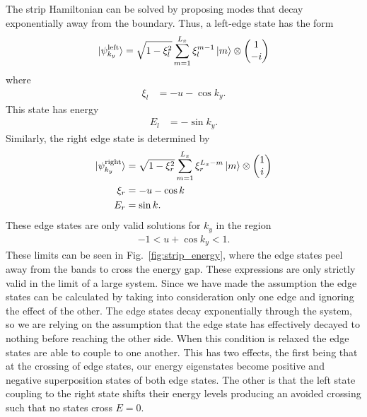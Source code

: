 The strip Hamiltonian can be solved by proposing modes that decay exponentially away from the boundary. Thus, a left-edge state has the form
\begin{align}
    \ket{\psi^{\textup{left}}_{k_y}} = \sqrt{1-\xi_l^2}\sum_{m=1}^{L_x} \xi_l^{m-1}\ket m \otimes \begin{pmatrix}
    1\\
    -i
    \end{pmatrix}
\end{align}
where 
\begin{align}
    \xi_l &= -u - \cos k_y.
\end{align}
This state has energy
\begin{align}
    E_l &= -\sin k_y.
\end{align}
Similarly, the right edge state is determined by
\begin{align}
    \ket {\psi^{\textup{right}}_{k_y}} &= \sqrt{1-\xi_r^2} \sum_{m=1}^{L_x} \xi_r^{L_x-m} \ket m \otimes  \begin{pmatrix}
    1\\
    i
    \end{pmatrix}\\
   	\xi_r &= -u-\cos k \label{eqn:edge_condition}\\
	E_r &= \sin k.
\end{align}
These edge states are only valid solutions for $k_y$ in the region
\begin{align}
	-1 < u+\cos k_y < 1.
\end{align}
These limits can be seen in Fig.~\ref{fig:strip_energy}, where the edge states peel away from the bands to cross the energy gap. These expressions are only strictly valid in the limit of a large system. Since we have made the assumption the edge states can be calculated by taking into consideration only one edge and ignoring the effect of the other. The edge states decay exponentially through the system, so we are relying on the assumption that the edge state has effectively decayed to nothing before reaching the other side. When this condition is relaxed the edge states are able to couple to one another. This has two effects, the first being that at the crossing of edge states, our energy eigenstates become positive and negative superposition states of both edge states. The other is that the left state coupling to the right state shifts their energy levels producing an avoided crossing such that no states cross $E = 0$.

